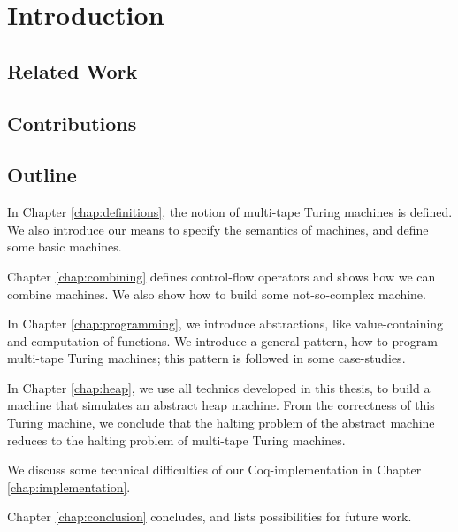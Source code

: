 \chapter{Introduction}
\label{chap:intro}

\section{Related Work}
\label{sec:relatedwork}

\section{Contributions}
\label{sec:contributions}

\section{Outline}
\label{sec:outline}

In Chapter \ref{chap:definitions}, the notion of multi-tape Turing machines is defined.
We also introduce our means to specify the semantics of machines, and define some basic machines.

Chapter \ref{chap:combining} defines control-flow operators and shows how we can combine machines.
We also show how to build some not-so-complex machine.

In Chapter \ref{chap:programming}, we introduce abstractions, like value-containing and computation of functions.
We introduce a general pattern, how to program multi-tape Turing machines; this pattern is followed in some case-studies.

In Chapter \ref{chap:heap}, we use all technics developed in this thesis, to build a machine that simulates an abstract heap machine.
From the correctness of this Turing machine, we conclude that the halting problem of the abstract machine reduces to the halting problem of multi-tape Turing machines.

We discuss some technical difficulties of our Coq-implementation in Chapter \ref{chap:implementation}.

Chapter \ref{chap:conclusion} concludes, and lists possibilities for future work.


